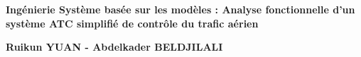 
\begin{titlepage}
	\parindent=0pt
 
\addtolength{\wpXoffset}{-4.5cm}

	
	\hrulefill
	\begin{center}\bfseries\Huge
		\color{white}
		{Ingénierie Système basée sur les modèles : Analyse fonctionnelle d'un système ATC simplifié de contrôle du trafic aérien} 
	\end{center}
	\hrulefill
	
	\vspace*{1cm}
	\begin{center}\bfseries\Large
			\color{white}
		{Ruikun YUAN - Abdelkader BELDJILALI}
		
	\end{center}
	


\end{titlepage}